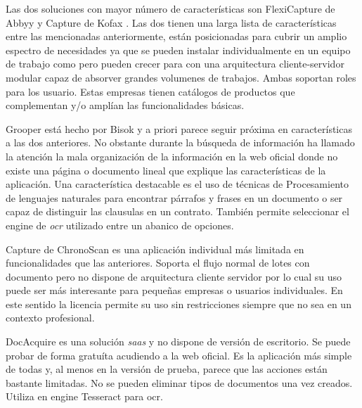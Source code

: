 Las dos soluciones con mayor número de características son FlexiCapture de Abbyy \cite{solucionesComerciales_abbyy_flexicapture4invoices} y Capture de Kofax \cite{solucionesComerciales_kofax_capture}. Las dos tienen una larga lista de características entre las mencionadas anteriormente, están posicionadas para cubrir un amplio espectro de necesidades ya que se pueden instalar individualmente en un equipo de trabajo como pero pueden crecer para con una arquitectura cliente-servidor modular capaz de absorver grandes volumenes de trabajos. Ambas soportan roles para los usuario. Estas empresas tienen catálogos de productos que complementan y/o amplían las funcionalidades básicas.

Grooper \cite{solucionesComerciales_bisok_grooper} está hecho por Bisok y a priori parece seguir próxima en características a las dos anteriores. No obstante durante la búsqueda de información ha llamado la atención la mala organización de la información en la web oficial donde no existe una página o documento lineal que explique las características de la aplicación. Una característica destacable es el uso de técnicas de Procesamiento de lenguajes naturales para encontrar párrafos y frases en un documento o ser capaz de distinguir las clausulas en un contrato. También permite seleccionar el engine de \emph{\acrlong{ocr}} utilizado entre un abanico de opciones.

Capture de ChronoScan \cite{solucionesComerciales_chronoScanCapture_chronoScanDocumentCapture} es una aplicación individual más limitada en funcionalidades que las anteriores. Soporta el flujo normal de lotes con documento pero no dispone de arquitectura cliente servidor por lo cual su uso puede ser más interesante para pequeñas empresas o usuarios individuales. En este sentido la licencia permite su uso sin restricciones siempre que no sea en un contexto profesional.

DocAcquire \cite{solucionesComerciales_docAcquire_docAcquire} es una solución \emph{\acrlong{saas}} y no dispone de versión de escritorio. Se puede probar de forma gratuíta acudiendo a la web oficial. Es la aplicación más simple de todas y, al menos en la versión de prueba, parece que las acciones están bastante limitadas. No se pueden eliminar tipos de documentos una vez creados. Utiliza en engine Tesseract para \acrshort{ocr}.


